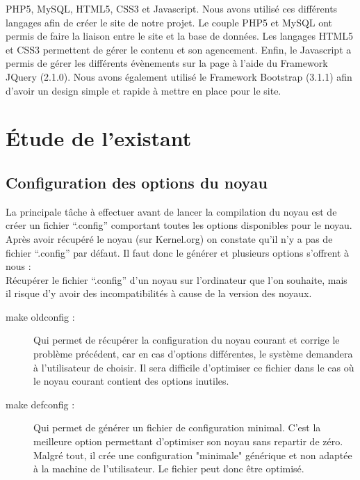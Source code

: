 \documentclass[16pts]{report}
\begin{document}
PHP5, MySQL, HTML5, CSS3 et Javascript. Nous avons utilisé ces différents 
langages afin de créer le site de notre projet. Le couple PHP5 et MySQL 
ont permis de faire la liaison entre le site et la base de données. Les 
langages HTML5 et CSS3 permettent de gérer le contenu et son agencement. 
Enfin, le Javascript a permis de gérer les différents évènements sur la 
page à l'aide du Framework JQuery (2.1.0). Nous avons également utilisé 
le Framework Bootstrap (3.1.1) afin d'avoir un design simple et rapide à 
mettre en place pour le site.
\\

\chapter{Étude de l'existant}
\label{cha:Étude de l'existant}

\section{Configuration des options du noyau}
\label{sec:Configuration des options du noyau}

La principale tâche à effectuer avant de lancer la compilation du noyau est de
créer un fichier “.config” comportant toutes les options disponibles pour le
noyau.  Après avoir récupéré le noyau (sur Kernel.org) on constate qu’il n’y a
pas de fichier “.config” par défaut. Il faut donc le générer et plusieurs
options s’offrent à nous :
\\

Récupérer le fichier “.config” d’un noyau sur l’ordinateur que l’on souhaite,
mais il risque d’y avoir des incompatibilités à cause de la version des noyaux.

\begin{description}
    \item[make oldconfig :] Qui permet de récupérer la configuration du noyau
        courant et corrige le problème précédent, car en cas d’options
        différentes, le système demandera à l’utilisateur de choisir. Il sera
        difficile d’optimiser ce fichier dans le cas où le noyau courant
        contient des options inutiles.
    \item[make defconfig :] Qui permet de générer un fichier de configuration
        minimal. C’est la meilleure option permettant d’optimiser son noyau
        sans repartir de zéro. Malgré tout, il crée une configuration
        "minimale" générique et non adaptée à la machine de l’utilisateur.
        Le fichier peut donc être optimisé.
\end{description}
\end{document}
